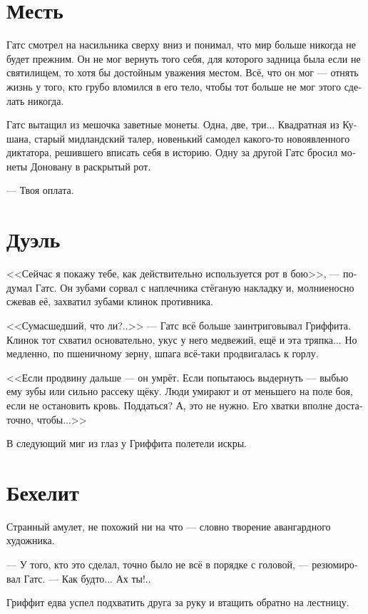 \documentclass[a4paper,12pt,fleqn]{book}\usepackage{polyglossia}\setdefaultlanguage[babelshorthands=true]{russian}\setotherlanguage{english}\defaultfontfeatures{Ligatures=TeX,Mapping=tex-text}\usepackage{xcolor}\newcommand{\ml}[3]{#2}
\begin{document}
\section{Месть}

Гатс смотрел на насильника сверху вниз и понимал, что мир больше никогда не будет прежним.
Он не мог вернуть того себя, для которого задница была если не святилищем, то хотя бы достойным уважения местом.
Всё, что он мог --- отнять жизнь у того, кто грубо вломился в его тело, чтобы тот больше не мог этого сделать никогда.

Гатс вытащил из мешочка заветные монеты.
Одна, две, три...
Квадратная из Кушана, старый мидландский талер, новенький самодел какого-то новоявленного диктатора, решившего вписать себя в историю.
Одну за другой Гатс бросил монеты Доновану в раскрытый рот.

--- Твоя оплата.

\section{Дуэль}

<<Сейчас я покажу тебе, как действительно используется рот в бою>>, --- подумал Гатс.
Он зубами сорвал с наплечника стёганую накладку и, молниеносно сжевав её, захватил зубами клинок противника.

<<Сумасшедший, что ли?..>> --- Гатс всё больше заинтриговывал Гриффита.
Клинок тот схватил основательно, укус у него медвежий, ещё и эта тряпка...
Но медленно, по пшеничному зерну, шпага всё-таки продвигалась к горлу.

<<Если продвину дальше --- он умрёт.
Если попытаюсь выдернуть --- выбью ему зубы или сильно рассеку щёку.
Люди умирают и от меньшего на поле боя, если не остановить кровь.
Поддаться?
А, это не нужно.
Его хватки вполне достаточно, чтобы...>>

В следующий миг из глаз у Гриффита полетели искры.

\section{Бехелит}

Странный амулет, не похожий ни на что --- словно творение авангардного художника.

--- У того, кто это сделал, точно было не всё в порядке с головой, --- резюмировал Гатс.
--- Как будто...
Ах ты!..

Гриффит едва успел подхватить друга за руку и втащить обратно на лестницу.
\end{document}
